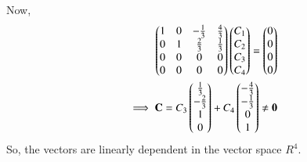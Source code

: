 \documentclass[journal,12pt,twocolumn]{IEEEtran}
\renewcommand\thesection{\arabic{section}}
\begin{document}
Now, 
\begin{align}
\begin{pmatrix}1 & 0 & -\frac{1}{3} & \frac{4}{3}\\0 & 1 & \frac{2}{3} & \frac{1}{3}\\0 & 0 & 0 & 0\\0 & 0 & 0 & 0\end{pmatrix} \begin{pmatrix}C_1\\C_2\\C_3\\C_4\end{pmatrix} = \begin{pmatrix}0\\0\\0\\0\end{pmatrix}\\
\implies \mathbf{C} = C_3 \begin{pmatrix}\frac{1}{3}\\-\frac{2}{3}\\1\\0\end{pmatrix} +C_4 \begin{pmatrix}-\frac{4}{3}\\-\frac{1}{3}\\0\\1\end{pmatrix} \neq \mathbf{0}
\end{align}
So, the vectors are linearly dependent in the vector space $R^4$.

\end{document}
